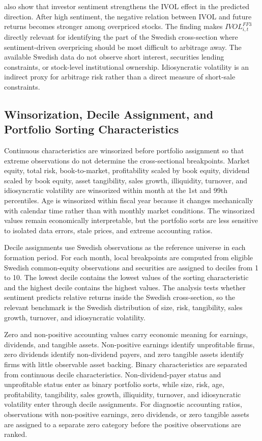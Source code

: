 \documentclass[11pt]{article}
\newcommand{\var}[1]{\ensuremath{#1}}
\begin{document}
\citet{stambaugh2015ivol} also show that investor sentiment strengthens the IVOL effect in the predicted direction. After high sentiment, the negative relation between IVOL and future returns becomes stronger among overpriced stocks. The finding makes \var{IVOL^{FF3}_{i,t}} directly relevant for identifying the part of the Swedish cross-section where sentiment-driven overpricing should be most difficult to arbitrage away. The available Swedish data do not observe short interest, securities lending constraints, or stock-level institutional ownership. Idiosyncratic volatility is an indirect proxy for arbitrage risk rather than a direct measure of short-sale constraints.

\subsection{Winsorization, Decile Assignment, and Portfolio Sorting Characteristics}
Continuous characteristics are winsorized before portfolio assignment so that extreme observations do not determine the cross-sectional breakpoints. Market equity, total risk, book-to-market, profitability scaled by book equity, dividend scaled by book equity, asset tangibility, sales growth, illiquidity, turnover, and idiosyncratic volatility are winsorized within month at the 1st and 99th percentiles. Age is winsorized within fiscal year because it changes mechanically with calendar time rather than with monthly market conditions. The winsorized values remain economically interpretable, but the portfolio sorts are less sensitive to isolated data errors, stale prices, and extreme accounting ratios.

Decile assignments use Swedish observations as the reference universe in each formation period. For each month, local breakpoints are computed from eligible Swedish common-equity observations and securities are assigned to deciles from 1 to 10. The lowest decile contains the lowest values of the sorting characteristic and the highest decile contains the highest values. The analysis tests whether sentiment predicts relative returns inside the Swedish cross-section, so the relevant benchmark is the Swedish distribution of size, risk, tangibility, sales growth, turnover, and idiosyncratic volatility.

Zero and non-positive accounting values carry economic meaning for earnings, dividends, and tangible assets. Non-positive earnings identify unprofitable firms, zero dividends identify non-dividend payers, and zero tangible assets identify firms with little observable asset backing. Binary characteristics are separated from continuous decile characteristics. Non-dividend-payer status and unprofitable status enter as binary portfolio sorts, while size, risk, age, profitability, tangibility, sales growth, illiquidity, turnover, and idiosyncratic volatility enter through decile assignments. For diagnostic accounting ratios, observations with non-positive earnings, zero dividends, or zero tangible assets are assigned to a separate zero category before the positive observations are ranked.
\end{document}
